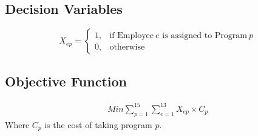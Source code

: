 \documentclass[12pt]{article}
\begin{document}
\subsection*{Decision Variables} 
  \begin{equation}
    X_{ep}=
    \begin{cases}
      1, & \text{if Employee}\ e \text{ is assigned to Program}\ p \\
      0, & \text{otherwise}
    \end{cases}
  \end{equation}

\subsection*{Objective Function} 

\begin{align*}
    Min \sum_{p = 1}^{15} \sum_{e = 1}^{13} X_{ep} \times C_p
\end{align*}
Where $C_p$ is the cost of taking program $p$.
\end{document}
